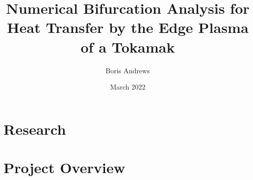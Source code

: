 \documentclass[12pt, a4paper]{report}
\title{Numerical Bifurcation Analysis for Heat Transfer by the Edge Plasma of a Tokamak}
\author{Boris Andrews}
\affil{Mathematical Institute, University of Oxford}
\date{March 2022}
\begin{document}
    \maketitle
    
    
    
    \begin{abstract}
    \end{abstract}
    
    
    
    \newpage
    \tableofcontents
    
    
    
    \newpage
            
        \part{Research}
            
            
            
            
        \part{Project Overview}
            
            
    
    
    
    \newpage
        \printbibliography
\end{document}

